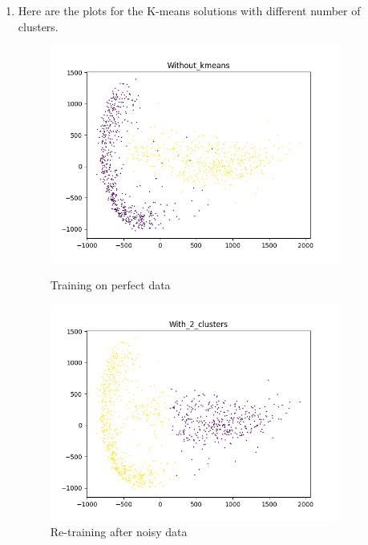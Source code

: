 \documentclass[11pt]{article}
\begin{document}
\begin{enumerate}
\begin{enumerate}
\item Here are the plots for the K-means solutions with different number of clusters.
\begin{figure}[h!]
    \centering
    \begin{minipage}{0.45\textwidth}
    	\centering
        \includegraphics[width=0.9\textwidth]{Without_kmeans}
        \caption{Training on perfect data}
    \end{minipage}\hfill
    \begin{minipage}{0.45\textwidth}
    	\centering
         \includegraphics[width=0.9\textwidth]{With_2_clusters}
         \caption{Re-training after noisy data}
    \end{minipage}\hfill
    \begin{minipage}{0.45\textwidth}
    	\centering

\end{minipage}
\end{figure}
\end{enumerate}
\end{enumerate}
\end{document}
